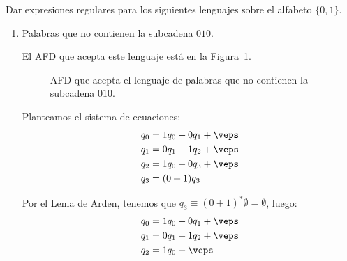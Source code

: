 \documentclass[12pt]{article}
\begin{document}
    \begin{ejercicio}[2.5 puntos]
        Dar expresiones regulares para los siguientes lenguajes sobre el alfabeto $\{0, 1\}$.
        \begin{enumerate}
            \item Palabras que no contienen la subcadena $010$.
            
            El AFD que acepta este lenguaje está en la Figura~\ref{fig:afd010}.
            \begin{figure}
                \centering
                \caption{AFD que acepta el lenguaje de palabras que no contienen la subcadena $010$.}
                \label{fig:afd010}
            \end{figure}

            Planteamos el sistema de ecuaciones:
            \begin{align*}
                q_0&=1q_0 + 0q_1 + \veps\\
                q_1&=0q_1 + 1q_2 + \veps\\
                q_2&=1q_0 + 0q_3 + \veps\\
                q_3&=(0+1)q_3
            \end{align*}

            Por el Lema de Arden, tenemos que $q_3\equiv (0+1)^*\emptyset=\emptyset$, luego:
            \begin{align*}
                q_0&=1q_0 + 0q_1 + \veps\\
                q_1&=0q_1 + 1q_2 + \veps\\
                q_2&=1q_0 + \veps\\
            \end{align*}


\end{enumerate}
\end{ejercicio}
\end{document}
